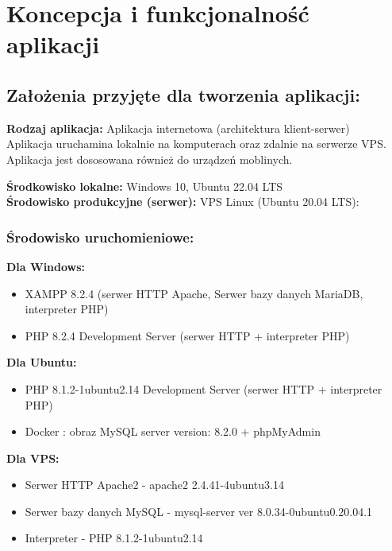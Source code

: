 \section{Koncepcja i funkcjonalność aplikacji}

\subsection{Założenia przyjęte dla tworzenia aplikacji:}
    \begin{flushleft}

        \textbf{Rodzaj aplikacja:} Aplikacja internetowa (architektura klient-serwer) \\

        Aplikacja uruchamina lokalnie na komputerach oraz zdalnie na serwerze VPS. \\
        Aplikacja jest dososowana również do urządzeń moblinych. \newline\newline

        \textbf{Środkowisko lokalne:} Windows 10, Ubuntu 22.04 LTS \\
        \textbf{Środowisko produkcyjne (serwer):} VPS Linux (Ubuntu 20.04 LTS): \\ 

        \subsubsection{Środowisko uruchomieniowe:}

        \textbf{Dla Windows:}
        \begin{itemize}
            \item XAMPP 8.2.4 (serwer HTTP Apache, Serwer bazy danych MariaDB, interpreter PHP)
            \item PHP 8.2.4 Development Server (serwer HTTP + interpreter PHP)
        \end{itemize}
            
        \textbf{Dla Ubuntu:}
        \begin{itemize}
            \item PHP 8.1.2-1ubuntu2.14 Development Server (serwer HTTP + interpreter PHP)
            \item Docker : obraz MySQL server version: 8.2.0 + phpMyAdmin
        \end{itemize}

        \textbf{Dla VPS:}
        \begin{itemize}
            \item Serwer HTTP Apache2 -  apache2 2.4.41-4ubuntu3.14 
            \item Serwer bazy danych MySQL - mysql-server  ver 8.0.34-0ubuntu0.20.04.1
            \item Interpreter - PHP 8.1.2-1ubuntu2.14 
        \end{itemize}
        
    \end{flushleft}

